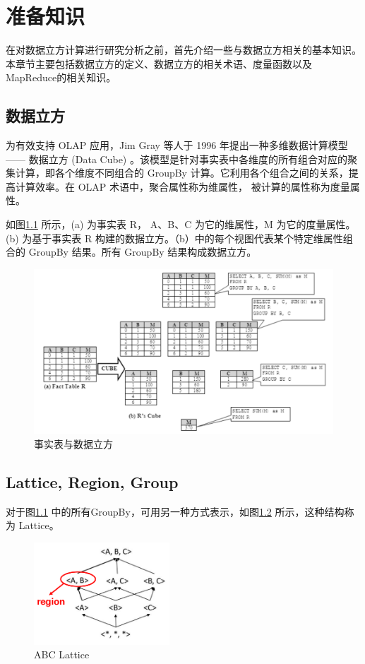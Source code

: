 \chapter{准备知识}

在对数据立方计算进行研究分析之前，首先介绍一些与数据立方相关的基本知识。本章节主要包括数据立方的定义、数据立方的相关术语、度量函数以及MapReduce的相关知识。

\section{数据立方}
为有效支持 OLAP 应用，Jim Gray 等人于 1996 年提出一种多维数据计算模型 —— 数据立方 (Data Cube) \cite{gray1997data}。该模型是针对事实表中各维度的所有组合对应的聚集计算，即各个维度不同组合的 GroupBy 计算。它利用各个组合之间的关系，提高计算效率。在 OLAP 术语中，聚合属性称为维属性， 被计算的属性称为度量属性。

如图\ref{fact_table_data_cube} 所示，(a) 为事实表 R， A、B、C 为它的维属性，M 为它的度量属性。(b) 为基于事实表 R 构建的数据立方。（b）中的每个视图代表某个特定维属性组合的 GroupBy 结果。所有 GroupBy 结果构成数据立方。

\begin{figure}[!htb]
\centering\includegraphics[width=6in]{picture/ch_preliminary/fact_table_data_cube} 
\caption{事实表与数据立方}\label{fact_table_data_cube} 
\end{figure} 

\section{Lattice, Region, Group}

对于图\ref{fact_table_data_cube} 中的所有GroupBy，可用另一种方式表示，如图\ref{abc_lattice} 所示，这种结构称为 Lattice。

\begin{figure}[!htb]
\centering\includegraphics[width=2in]{picture/ch_preliminary/abc_lattice} 
\caption{ABC Lattice}\label{abc_lattice} 
\end{figure} 

